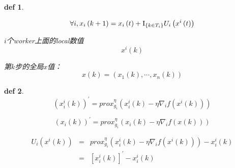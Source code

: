 \documentclass{ctexart}
\begin{document}
\newtheorem{mydef}{def}
\newtheorem{myth}{Th}

\begin{mydef}
\begin{equation}\label{eq:1}
  \end{equation}

\begin{equation}\label{eq:2}
  \forall i,{x_i}\left( {k + 1} \right) = {x_i}\left( t \right) + {{\rm I}_{\left\{ {k \in {T_i}} \right\}}}{U_i}\left( {{x^i}\left( t \right)} \right)
\end{equation}

$i$个worker上面的local数值
\begin{equation}\label{eq:3}
  x^{i}\left(k\right)
\end{equation}

第$k$步的全局$x$值：
\begin{equation}\label{eq:4}
  x\left(k\right)=\left(x_1(k),\cdots,x_n(k)\right)
\end{equation}
\end{mydef}

\begin{mydef}
\begin{equation}\label{eq:5}
  {\left( {x_i^i\left( k \right)} \right)^'} = prox_{{g_i}}^\eta \left( {x_i^i\left( k \right) - \eta {\nabla _i}f\left( {{x^i}\left( k \right)} \right)} \right)
\end{equation}
    
\begin{equation}\label{eq:6}
    {\left( {{x_i}\left( k \right)} \right)^'} = prox_{{g_i}}^\eta \left( {{x_i}\left( k \right) - \eta {\nabla _i}f\left( {x\left( k \right)} \right)} \right)
\end{equation}

\begin{eqnarray}
  {U_i}\left( {{x^i}\left( k \right)} \right) &=& prox_{{g_i}}^\eta \left( {x_i^i\left( k \right) - \eta {\nabla _i}f\left( {{x^i}\left( k \right)} \right)} \right) - x_i^i\left( k \right) \nonumber\\
   &=& {\left[ {x_i^i\left( k \right)} \right]^'} - x_i^i\left( k \right)
\end{eqnarray}

\end{mydef}
\end{document}

